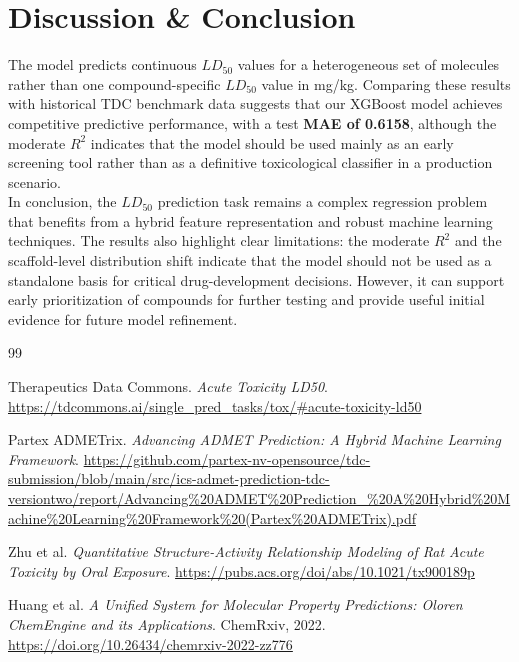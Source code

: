 \documentclass[10pt,a4paper,twocolumn]{article}
\begin{document}
\section{Discussion \& Conclusion}
The model predicts continuous $LD_{50}$ 
values for a heterogeneous set of molecules 
rather than one compound-specific $LD_{50}$ value 
in mg/kg. Comparing these results with historical 
TDC benchmark data suggests that our XGBoost model 
achieves competitive predictive performance, 
with a test \textbf{MAE of 0.6158}, although the moderate 
$R^2$ indicates that the model should be used mainly 
as an early screening tool rather than as a 
definitive toxicological classifier in a production 
scenario.\\


In conclusion, the $LD_{50}$ prediction task remains a complex regression
problem that benefits from a hybrid feature representation and robust machine
learning techniques. The results also highlight clear limitations: the moderate
$R^2$ and the scaffold-level distribution shift indicate that the model should
not be used as a standalone basis for critical drug-development decisions.
However, it can support early prioritization of compounds for further testing
and provide useful initial evidence for future model refinement.

\begin{thebibliography}{99}

Therapeutics Data Commons. \textit{Acute Toxicity LD50}.
\url{https://tdcommons.ai/single_pred_tasks/tox/#acute-toxicity-ld50}

Partex ADMETrix. \textit{Advancing ADMET Prediction: A Hybrid Machine Learning Framework}.
\url{https://github.com/partex-nv-opensource/tdc-submission/blob/main/src/ics-admet-prediction-tdc-versiontwo/report/Advancing%20ADMET%20Prediction_%20A%20Hybrid%20Machine%20Learning%20Framework%20(Partex%20ADMETrix).pdf}

Zhu et al. \textit{Quantitative Structure-Activity Relationship Modeling of Rat Acute Toxicity by Oral Exposure}.
\url{https://pubs.acs.org/doi/abs/10.1021/tx900189p}

Huang et al. \textit{A Unified System for Molecular Property Predictions: Oloren ChemEngine and its Applications}. ChemRxiv, 2022.
\url{https://doi.org/10.26434/chemrxiv-2022-zz776}

\end{thebibliography}
\end{document}

